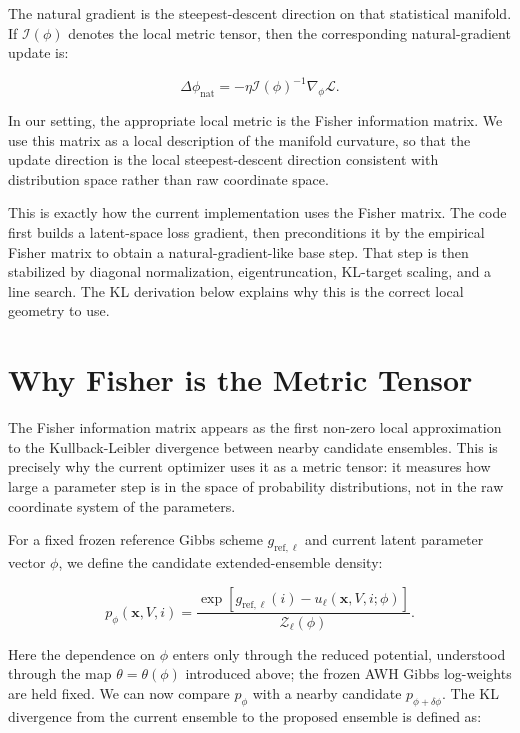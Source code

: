 The natural gradient is the steepest-descent direction on that statistical manifold. If $\mathcal{I}(\phi)$ denotes the local metric tensor, then the corresponding natural-gradient update is:

\begin{equation}
    \Delta \phi_{\mathrm{nat}}
    =
    -
    \eta
    \mathcal{I}(\phi)^{-1}
    \nabla_\phi \mathcal{L}.
    \label{eq:natstep}
\end{equation}

In our setting, the appropriate local metric is the Fisher information matrix. We use this matrix as a local description of the manifold curvature, so that the update direction is the local steepest-descent direction consistent with distribution space rather than raw coordinate space.

This is exactly how the current implementation uses the Fisher matrix. The code first builds a latent-space loss gradient, then preconditions it by the empirical Fisher matrix to obtain a natural-gradient-like base step. That step is then stabilized by diagonal normalization, eigentruncation, KL-target scaling, and a line search. The KL derivation below explains why this is the correct local geometry to use.

\section{Why Fisher is the Metric Tensor}

The Fisher information matrix appears as the first non-zero local approximation to the Kullback-Leibler divergence between nearby candidate ensembles. This is precisely why the current optimizer uses it as a metric tensor: it measures how large a parameter step is in the space of probability distributions, not in the raw coordinate system of the parameters.

For a fixed frozen reference Gibbs scheme $g_{\mathrm{ref},\ell}$ and current latent parameter vector $\phi$, we define the candidate extended-ensemble density:

\begin{equation}
    p_\phi(\mathbf{x}, V, i)
    =
    \frac{
        \exp \left[
            g_{\mathrm{ref},\ell}(i)
            -
            u_\ell(\mathbf{x}, V, i; \phi)
        \right]
    }{
        \mathcal{Z}_\ell(\phi)
    }.
    \label{eq:pphi}
\end{equation}

Here the dependence on $\phi$ enters only through the reduced potential, understood through the map $\theta = \theta(\phi)$ introduced above; the frozen AWH Gibbs log-weights are held fixed. We can now compare $p_\phi$ with a nearby candidate $p_{\phi + \delta \phi}$. The KL divergence from the current ensemble to the proposed ensemble is defined as:

